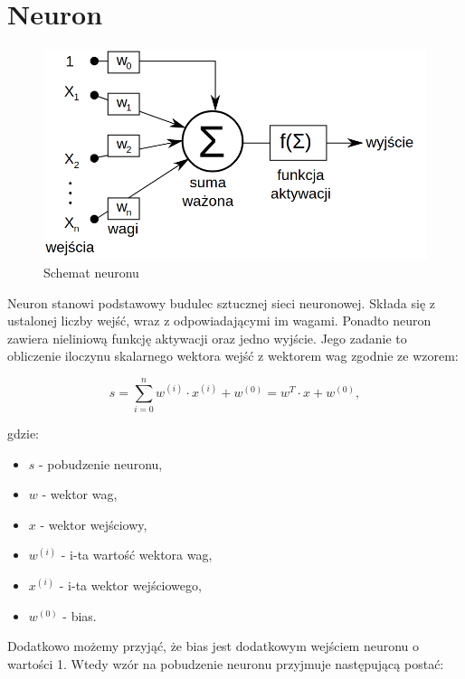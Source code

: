     \section{Neuron}\label{sec:neuron}

    \begin{figure}[htp]
        \centering
        \includegraphics[scale=0.4]{./img/neuron.png}
        \caption{Schemat neuronu}
    \end{figure}

    Neuron stanowi podstawowy budulec sztucznej sieci neuronowej.
    Składa się z ustalonej liczby wejść, wraz z odpowiadającymi im wagami.
    Ponadto neuron zawiera nieliniową funkcję aktywacji oraz jedno wyjście.
    Jego zadanie to obliczenie iloczynu skalarnego wektora wejść z wektorem wag zgodnie ze wzorem:

    \begin{equation}
        s = \sum _{i=0}^{n} {w^{(i)} \cdot x^{(i)}} + w^{(0)} = w^T \cdot x + w^{(0)},
        \label{neuron-eq1}
    \end{equation}

    gdzie:
    \begin{itemize}
        \item $s$ - pobudzenie neuronu,
        \item $w$ - wektor wag,
        \item $x$ - wektor wejściowy,
        \item $w^{(i)}$ - i-ta wartość wektora wag,
        \item $x^{(i)}$ - i-ta wektor wejściowego,
        \item $w^{(0)}$ - bias.
    \end{itemize}

    Dodatkowo możemy przyjąć, że bias jest dodatkowym wejściem neuronu o wartości 1.
    Wtedy wzór na pobudzenie neuronu przyjmuje następującą postać:

